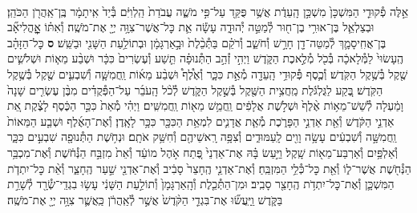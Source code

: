 \documentclass[twoside, openany, parskip=half, 11pt]{book}
\begin{document}
\begin{footnotesize}
\begin{multicols}{2}
\\
אֵ֣לֶּה פְ֯קוּדֵ֤י הַמִּשְׁכָּן֙ מִשְׁכַּ֣ן הָֽעֵדֻ֔ת אֲשֶׁ֥ר פֻּקַּ֖ד עַל־פִּ֣י מֹשֶׁ֑ה עֲבֹדַת֙ הַֽלְוִיִּ֔ם בְּ֯יַד֙ אִֽיתָמָ֔ר בֶּֽן־אַֽהֲרֹ֖ן הַכֹּהֵֽן׃ וּבְצַלְאֵ֛ל בֶּן־אוּרִ֥י בֶן־ח֖וּר לְ֯מַטֵּ֣ה יְ֯הוּדָ֑ה עָשָׂ֕ה אֵ֛ת כׇּל־אֲשֶׁר־צִוָּ֥ה יְיָ֖ אֶת־מֹשֶֽׁה׃ וְ֯אִתּ֗וֹ אׇׇׇׇׇׇׇׇׇׇׇׇׇׇׇׇׇׇֽהֳלִיאָ֞ב בֶּן־אֲחִֽיסָמָ֛ךְ לְ֯מַטֵּה־דָ֖ן חָרָ֣שׁ וְ֯חֹשֵׁ֑ב וְ֯רֹקֵ֗ם בַּתְּ֯כֵ֨לֶת֙ וּבָ֣אַרְגָּמָ֔ן וּבְתוֹלַ֥עַת הַשָּׁנִ֖י וּבַשֵּֽׁשׁ׃ \textbf{ס}  כׇּל־הַזָּהָ֗ב הֶֽעָשׂוּי֙ לַמְּ֯לָאכָ֔ה בְּ֯כֹ֖ל מְ֯לֶ֣אכֶת הַקֹּ֑דֶשׁ וַיְהִ֣י זְ֯הַ֣ב הַתְּ֯נוּפָ֗ה תֵּ֤שַׁע וְ֯עֶשְׂרִים֙ כִּכָּ֔ר וּשְׁבַ֨ע מֵא֧וֹת וּשְׁלֹשִׁ֛ים שֶׁ֖קֶל בְּ֯שֶׁ֥קֶל הַקֹּֽדֶשׁ׃ וְ֯כֶ֛סֶף פְּ֯קוּדֵ֥י הָֽעֵדָ֖ה מְ֯אַ֣ת כִּכָּ֑ר וְ֯אֶ֩לֶף֩ וּשְׁבַ֨ע מֵא֜וֹת וַֽחֲמִשָּׁ֧ה וְ֯שִׁבְעִ֛ים שֶׁ֖קֶל בְּ֯שֶׁ֥קֶל הַקֹּֽדֶשׁ׃ בֶּ֚קַע לַגֻּלְגֹּ֔לֶת מַֽחֲצִ֥ית הַשֶּׁ֖קֶל בְּ֯שֶׁ֣קֶל הַקֹּ֑דֶשׁ לְ֯כֹ֨ל הָֽעֹבֵ֜ר עַל־הַפְּ֯קֻדִ֗ים מִבֶּ֨ן עֶשְׂרִ֤ים שָׁנָה֙ וָמַ֔עְלָה לְ֯שֵׁשׁ־מֵא֥וֹת אֶ֨לֶף֙ וּשְׁלֹ֣שֶׁת אֲלָפִ֔ים וַֽחֲמֵ֥שׁ מֵא֖וֹת וַֽחֲמִשִּֽׁים׃ וַיְהִ֗י מְ֯אַת֙ כִּכַּ֣ר הַכֶּ֔סֶף לָצֶ֗קֶת אֵ֚ת אַדְנֵ֣י הַקֹּ֔דֶשׁ וְ֯אֵ֖ת אַדְנֵ֣י הַפָּרֹ֑כֶת מְ֯אַ֧ת אֲדָנִ֛ים לִמְאַ֥ת הַכִּכָּ֖ר כִּכָּ֥ר לָאָֽדֶן׃  וְ֯אֶת־הָאֶ֜לֶף וּשְׁבַ֤ע הַמֵּאוֹת֙ וַֽחֲמִשָּׁ֣ה וְ֯שִׁבְעִ֔ים עָשָׂ֥ה וָוִ֖ים לָֽעַמּוּדִ֑ים וְ֯צִפָּ֥ה רָֽאשֵׁיהֶ֖ם וְ֯חִשַּׁ֥ק אֹתָֽם׃ וּנְחֹ֥שֶׁת הַתְּ֯נוּפָ֖ה שִׁבְעִ֣ים כִּכָּ֑ר וְ֯אַלְפַּ֥יִם וְ֯אַרְבַּע־מֵא֖וֹת שָֽׁקֶל׃ וַיַּ֣עַשׂ בָּ֗הּ אֶת־אַדְנֵי֙ פֶּ֚תַח אֹ֣הֶל מוֹעֵ֔ד וְ֯אֵת֙ מִזְבַּ֣ח הַנְּ֯חֹ֔שֶׁת וְ֯אֶת־מִכְבַּ֥ר הַנְּ֯חֹ֖שֶׁת אֲשֶׁר־ל֑וֹ וְ֯אֵ֖ת כׇּל־כְּ֯לֵ֥י הַמִּזְבֵּֽחַ׃ וְ֯אֶת־אַדְנֵ֤י הֶֽחָצֵר֙ סָבִ֔יב וְ֯אֶת־אַדְנֵ֖י שַׁ֣עַר הֶֽחָצֵ֑ר וְ֯אֵ֨ת כׇּל־יִתְדֹ֧ת הַמִּשְׁכָּ֛ן וְ֯אֶת־כׇּל־יִתְדֹ֥ת הֶֽחָצֵ֖ר סָבִֽיב׃ וּמִן־הַתְּ֯כֵ֤לֶת וְ֯הָֽאַרְגָּמָן֙ וְ֯תוֹלַ֣עַת הַשָּׁנִ֔י עָשׂ֥וּ בִגְדֵֽי־שְׂ֯רָ֖ד לְ֯שָׁרֵ֣ת בַּקֹּ֑דֶשׁ וַֽיַּֽעֲשׂ֞וּ אֶת־בִּגְדֵ֤י הַקֹּ֨דֶשׁ֙ אֲשֶׁ֣ר לְ֯אַֽהֲרֹ֔ן כַּֽאֲשֶׁ֛ר צִוָּ֥ה יְיָ֖ אֶת־מֹשֶֽׁה׃


\end{multicols}
\end{footnotesize}
\end{document}
